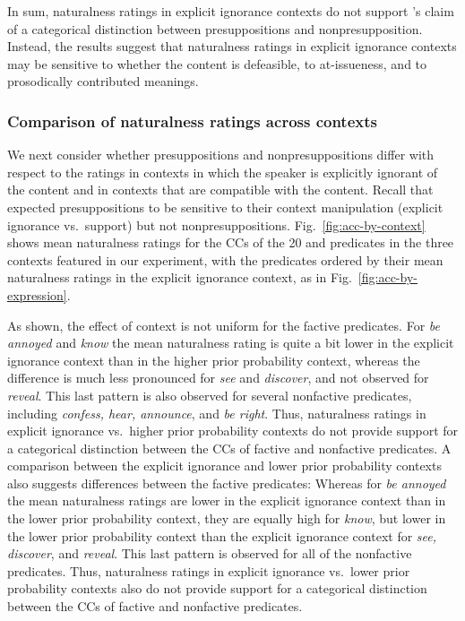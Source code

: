 \documentclass[11pt,fleqn]{article}
\newcommand{\6}{\mbox{$[\hspace*{-.6mm}[$}}
\newcommand{\9}{\mbox{$]\hspace*{-.6mm}]$}}
\newcommand{\citepos}[1]{\citeauthor{#1}'s \citeyear{#1}}
\begin{document}
In sum, naturalness ratings in explicit ignorance contexts do not support \citepos{mandelkern-etal2020} claim of a categorical distinction between presuppositions and nonpresupposition. Instead, the results suggest that naturalness ratings in explicit ignorance contexts may be sensitive to whether the content is defeasible, to at-issueness, and to prosodically contributed meanings.

\subsubsection{Comparison of naturalness ratings across contexts}\label{s:analysis2}

We next consider whether presuppositions and nonpresuppositions differ with respect to the ratings in contexts in which the speaker is explicitly ignorant of the content and in contexts that are compatible with the content. Recall that \citealt{mandelkern-etal2020} expected presuppositions to be sensitive to their context manipulation (explicit ignorance vs.\ support) but not nonpresuppositions. Fig.~\ref{fig:acc-by-context} shows mean naturalness ratings for the CCs of the 20  and  predicates in the three contexts featured in our experiment, with the predicates ordered by their mean naturalness ratings in the explicit ignorance context, as in Fig.~\ref{fig:acc-by-expression}. 

As shown, the effect of context is not uniform for the factive predicates. For {\em be annoyed} and {\em know} the mean naturalness rating is quite a bit lower in the explicit ignorance context than in the higher prior probability context, whereas the difference is much less pronounced for {\em see} and {\em discover}, and not observed for {\em reveal}. This last pattern is also observed for several nonfactive predicates, including {\em confess, hear, announce}, and {\em be right}. Thus, naturalness ratings in explicit ignorance vs.\ higher prior probability contexts do not provide support for a categorical distinction between the CCs of factive and nonfactive predicates. A comparison between the explicit ignorance and lower prior probability contexts also suggests differences between the factive predicates: Whereas for {\em be annoyed} the mean naturalness ratings are lower in the explicit ignorance context than in the lower prior probability context, they are equally high for {\em know}, but lower in the lower prior probability context than the explicit ignorance context for {\em see, discover}, and {\em reveal}. This last pattern is observed for all of the nonfactive predicates. Thus, naturalness ratings in explicit ignorance vs.\ lower prior probability contexts also do not provide support for a categorical distinction between the CCs of factive and nonfactive predicates. 
\end{document}
